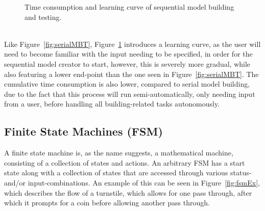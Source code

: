 \begin{description}
\begin{figure}[h]
    \caption{Time consumption and learning curve of sequential model building and testing.}
    \label{fig:sequenceMBT}
  \end{figure}\\
  Like Figure~\ref{fig:serialMBT}, Figure~\ref{fig:sequenceMBT} introduces a learning curve, as the user will need to become familiar with the input needing to be specified, in order for the sequential model creator to start, however, this is severely more gradual, while also featuring a lower end-point than the one seen in Figure~\ref{fig:serialMBT}. The cumulative time consumption is also lower, compared to serial model building, due to the fact that this process will run semi-automatically, only needing input from a user, before handling all building-related tasks autonomously.
\end{description}
\newpage
\subsection{Finite State Machines (FSM)}
A finite state machine is, as the name suggests, a mathematical machine, consisting of a collection of states and actions. An arbitrary FSM has a start state along with a collection of states that are accessed through various status- and/or input-combinations. An example of this can be seen in Figure~\ref{fig:fsmEx}, which describes the flow of a turnstile, which allows for one pass through, after which it prompts for a coin before allowing another pass through.

